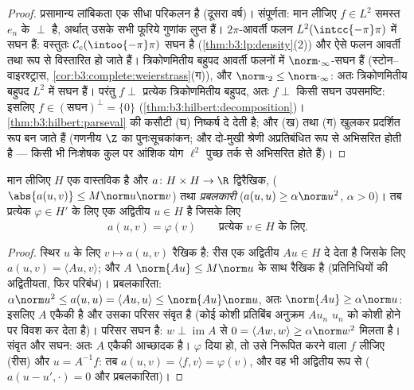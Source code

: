 \begin{proof}
प्रसामान्य लांबिकता एक सीधा परिकलन है (दूसरा वर्ष)। संपूर्णता: मान
लीजिए $f \in L^2$ समस्त $e_n$ के $\perp$ है, अर्थात् उसके सभी फूरिये
गुणांक लुप्त हैं।  $2\pi$-आवर्ती फलन $L^2(\intcc{-\pi}\pi)$ में सघन हैं: वस्तुतः
$\mathcal
C_c(\intoo{-\pi}\pi)$ सघन है (\cref{thm:b3:lp:density}(2)) और ऐसे फलन आवर्ती तथा  रूप से
विस्तारित हो जाते हैं। त्रिकोणमितीय बहुपद  आवर्ती फलनों में
$\norm\cdot_\infty$-सघन हैं (स्टोन--वाइरश्ट्रास, \cref{cor:b3:complete:weierstrass}(ग)), और $\norm\cdot_2 \leq \norm\cdot_\infty$: अतः
त्रिकोणमितीय बहुपद $L^2$ में सघन हैं। परंतु $f \perp$ प्रत्येक
त्रिकोणमितीय बहुपद, अतः $f \perp$ किसी सघन उपसमष्टि: इसलिए $f
\in (\text{सघन})^\perp = \{0\}$
(\cref{thm:b3:hilbert:decomposition})। \cref{thm:b3:hilbert:parseval} की कसौटी (घ) निष्कर्ष दे देती है; और (ख) तथा (ग)
खुलकर प्रदर्शित रूप बन जाते हैं (गणनीय $\Z$ का पुनःसूचकांकन; और
दो-मुखी श्रेणी अप्रतिबंधित रूप से अभिसरित होती है --- किसी भी
निःशेषक कुल पर आंशिक योग $\ell^2$ पुच्छ तर्क से अभिसरित होते हैं)।
\end{proof}

\begin{theorem}[लाक्स--मिलग्राम]\label{thm:b3:hilbert:laxmilgram}
मान लीजिए $H$ एक वास्तविक  है और $a \colon H\times H \to
\R$
द्विरैखिक, \emph{} ($\abs{a(u,v)} \leq M\norm
u\norm v$) तथा \emph{प्रबलकारी} ($a(u, u) \geq \alpha\norm u^2$,
$\alpha > 0$)। तब प्रत्येक $\varphi \in H'$ के लिए एक अद्वितीय $u \in H$ है जिसके
लिए
\[
a(u, v) = \varphi(v) \qquad \text{प्रत्येक } v \in H \text{ के लिए} .
\]
\end{theorem}

\begin{proof}
स्थिर $u$ के लिए $v \mapsto a(u, v)$  रैखिक है: रीस एक अद्वितीय $Au \in H$ दे
देता है जिसके लिए $a(u,v) = \langle Au,
v\rangle$; और $A$ $\norm{Au} \leq M\norm u$ के साथ रैखिक है
(प्रतिनिधियों की अद्वितीयता, फिर परिबंध)। प्रबलकारिता: $\alpha\norm u^2 \leq a(u,u) = \langle Au, u\rangle \leq
\norm{Au}\norm u$, अतः
$\norm{Au} \geq \alpha\norm u$: इसलिए $A$ एकैकी है और उसका परिसर संवृत है (कोई कोशी
प्रतिबिंब अनुक्रम $Au_n$ $u_n$ को कोशी होने पर विवश कर देता है)।
परिसर सघन है: $w \perp
\operatorname{im}A$ से $0 = \langle Aw, w\rangle \geq
\alpha\norm w^2$ मिलता है। संवृत और सघन: अतः $A$
एकैकी आच्छादक है। $\varphi$ दिया हो, तो उसे निरूपित करने वाला $f$
लीजिए (रीस) और $u = A^{-1}f$: तब $a(u, v) = \langle f, v\rangle = \varphi(v)$, और वह भी अद्वितीय रूप से ($a(u - u', \cdot) = 0$
और प्रबलकारिता)।
\end{proof}

